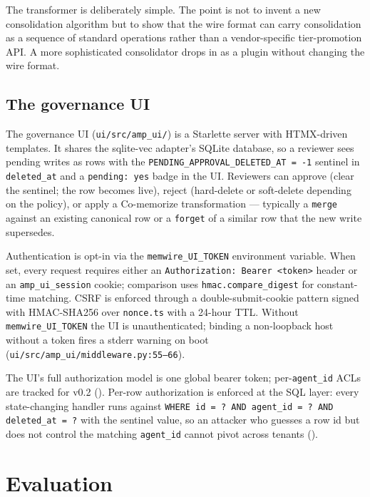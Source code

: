 \documentclass[11pt,letterpaper,twocolumn]{article}
\begin{document}
The transformer is deliberately simple. The point is not to invent a new consolidation algorithm but to show that the wire format can carry consolidation as a sequence of standard operations rather than a vendor-specific tier-promotion API. A more sophisticated consolidator drops in as a plugin without changing the wire format.

\subsection{The governance UI}
\label{sec:impl-ui}

The governance UI (\texttt{ui/src/amp\_ui/}) is a Starlette server with HTMX-driven templates. It shares the sqlite-vec adapter's SQLite database, so a reviewer sees pending writes as rows with the \texttt{PENDING\_APPROVAL\_DELETED\_AT = -1} sentinel in \texttt{deleted\_at} and a \texttt{pending: yes} badge in the UI. Reviewers can approve (clear the sentinel; the row becomes live), reject (hard-delete or soft-delete depending on the policy), or apply a Co-memorize transformation --- typically a \texttt{merge} against an existing canonical row or a \texttt{forget} of a similar row that the new write supersedes.

Authentication is opt-in via the \texttt{memwire\_UI\_TOKEN} environment variable. When set, every request requires either an \texttt{Authorization: Bearer <token>} header or an \texttt{amp\_ui\_session} cookie; comparison uses \texttt{hmac.compare\_digest} for constant-time matching. CSRF is enforced through a double-submit-cookie pattern signed with HMAC-SHA256 over \texttt{nonce.ts} with a 24-hour TTL. Without \texttt{memwire\_UI\_TOKEN} the UI is unauthenticated; binding a non-loopback host without a token fires a stderr warning on boot (\texttt{ui/src/amp\_ui/middleware.py:55--66}).

The UI's full authorization model is one global bearer token; per-\texttt{agent\_id} ACLs are tracked for v0.2 (). Per-row authorization is enforced at the SQL layer: every state-changing handler runs against \texttt{WHERE id = ? AND agent\_id = ? AND deleted\_at = ?} with the sentinel value, so an attacker who guesses a row id but does not control the matching \texttt{agent\_id} cannot pivot across tenants ().

\section{Evaluation}
\label{sec:eval}
\end{document}

